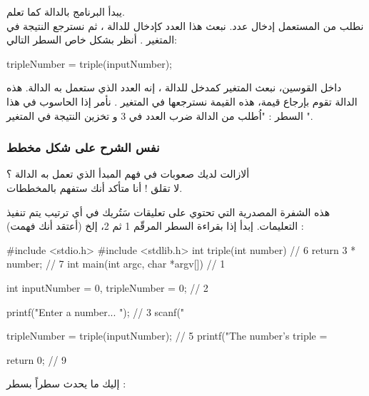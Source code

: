 يبدأ البرنامج بالدالة 
كما تعلم.\\
نطلب من المستعمل إدخال عدد. نبعث هذا العدد كإدخال للدالة 
،
ثم نسترجع النتيجة في المتغير 
.
أنظر بشكل خاص السطر التالي:

\begin{Csource}
tripleNumber = triple(inputNumber);
\end{Csource}

داخل القوسين، نبعث المتغير كمدخل للدالة 
،
إنه العدد الذي ستعمل به الدالة. هذه الدالة تقوم بإرجاع قيمة، هذه القيمة نسترجعها في المتغير 
.
نأمر إذا الحاسوب في هذا السطر : "اُطلب من الدالة 
ضرب العدد
في 3 و تخزين النتيجة في المتغير 
".

\subsubsection{نفس الشرح على شكل مخطط}

ألازالت لديك صعوبات في فهم المبدأ الذي تعمل به الدالة ؟\\
لا تقلق ! أنا متأكد أنك ستفهم بالمخططات.

هذه الشفرة المصدرية التي تحتوي على تعليقات سَتُريك في أي ترتيب يتم تنفيذ التعليمات. إبدأ إذا بقراءة السطر المرقّم 1 ثم 2، إلخ (أعتقد أنك فهمت) :

\begin{Csource}
#include <stdio.h>
#include <stdlib.h>
int triple(int number) // 6
{
	return 3 * number; // 7
}   
int main(int argc, char *argv[]) // 1
{
	int inputNumber = 0, tripleNumber = 0; // 2
	
	printf("Enter a number... "); // 3
	scanf("%
	
	tripleNumber = triple(inputNumber); // 5
	printf("The number's triple = %
	
	return 0; // 9
}
\end{Csource}

إليك ما يحدث سطراً بسطر :

